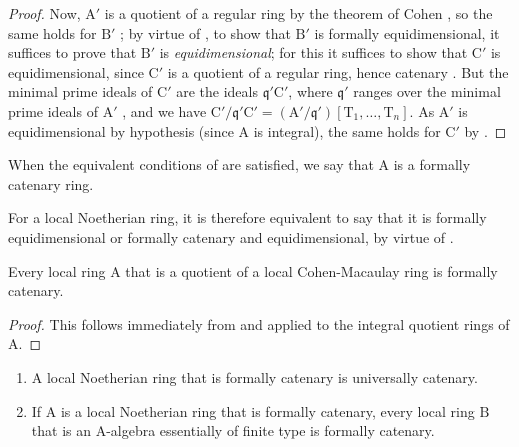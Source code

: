 \begin{proof}
Now, $\mathrm{A}'$ is a quotient of a regular ring by the theorem of Cohen , so the same holds for $\mathrm{B}'$ ; by virtue of , to show that $\mathrm{B}'$ is formally equidimensional, it suffices to prove that $\mathrm{B}'$ is \emph{equidimensional}; for this it suffices to show that $\mathrm{C}'$ is equidimensional, since $\mathrm{C}'$ is a quotient of a regular ring, hence catenary .
But the minimal prime ideals of $\mathrm{C}'$ are the ideals $\mathfrak{q}'\mathrm{C}'$, where $\mathfrak{q}'$ ranges over the minimal prime ideals of $\mathrm{A}'$ , and we have $\mathrm{C}'/\mathfrak{q}'\mathrm{C}'=(\mathrm{A}'/\mathfrak{q}')[\mathrm{T}_1,\ldots,\mathrm{T}_n]$.
As $\mathrm{A}'$ is equidimensional by hypothesis (since $\mathrm{A}$ is integral), the same holds for $\mathrm{C}'$ by .
\end{proof}

\begin{definition}[7.1.9]
\label{IV.7.1.9}
When the equivalent conditions of  are satisfied, we say that $\mathrm{A}$ is a formally catenary ring.
\end{definition}

For a local Noetherian ring, it is therefore equivalent to say that it is formally equidimensional or formally catenary and equidimensional, by virtue of .

\begin{proposition}[7.1.10]
\label{IV.7.1.10}
Every local ring $\mathrm{A}$ that is a quotient of a local Cohen-Macaulay ring is formally catenary.
\end{proposition}

\begin{proof}
This follows immediately from  and  applied to the integral quotient rings of $\mathrm{A}$.
\end{proof}

\begin{proposition}[7.1.11]
\label{IV.7.1.11}
\begin{enumerate}[label=\emph{\roman*)}]
  \item A local Noetherian ring that is formally catenary is universally catenary.
  \item If $\mathrm{A}$ is a local Noetherian ring that is formally catenary, every local ring $\mathrm{B}$ that is an A-algebra essentially of finite type is formally catenary.
\end{enumerate}
\end{proposition}

